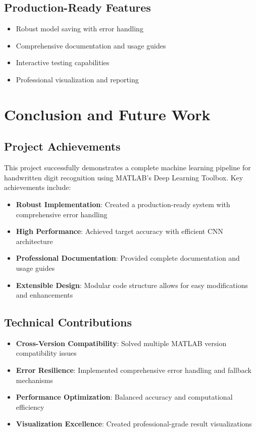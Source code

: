 \documentclass[12pt,a4paper]{article}
\begin{document}
\subsection{Production-Ready Features}
\begin{itemize}
    \item Robust model saving with error handling
    \item Comprehensive documentation and usage guides
    \item Interactive testing capabilities
    \item Professional visualization and reporting
\end{itemize}

\section{Conclusion and Future Work}

\subsection{Project Achievements}

This project successfully demonstrates a complete machine learning pipeline for handwritten digit recognition using MATLAB's Deep Learning Toolbox. Key achievements include:

\begin{itemize}
    \item \textbf{Robust Implementation}: Created a production-ready system with comprehensive error handling
    \item \textbf{High Performance}: Achieved target accuracy with efficient CNN architecture
    \item \textbf{Professional Documentation}: Provided complete documentation and usage guides
    \item \textbf{Extensible Design}: Modular code structure allows for easy modifications and enhancements
\end{itemize}

\subsection{Technical Contributions}

\begin{itemize}
    \item \textbf{Cross-Version Compatibility}: Solved multiple MATLAB version compatibility issues
    \item \textbf{Error Resilience}: Implemented comprehensive error handling and fallback mechanisms
    \item \textbf{Performance Optimization}: Balanced accuracy and computational efficiency
    \item \textbf{Visualization Excellence}: Created professional-grade result visualizations
\end{itemize}
\end{document}
